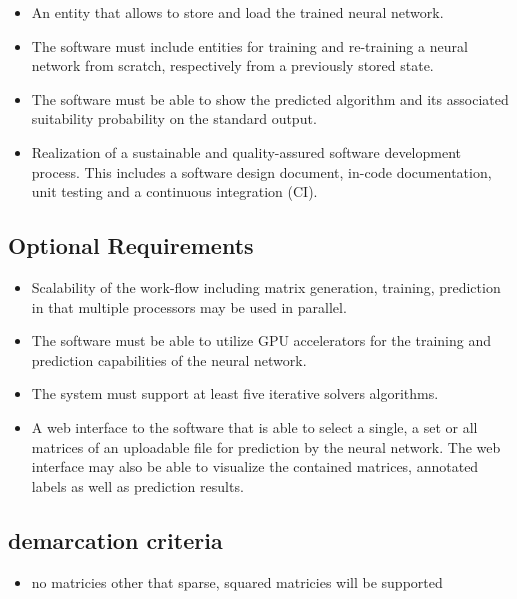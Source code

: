 \documentclass[parskip=full]{scrartcl}
\begin{document}
\begin{itemize}
\item An entity that allows to store and load the trained neural network.

\item The software must include entities for training and re-training a neural network from scratch, respectively from a previously stored state.

\item The software must be able to show the predicted algorithm and its associated suitability probability on the standard output.

\item Realization of a sustainable and quality-assured software development process. This includes a software design document, in-code documentation, unit testing and a continuous integration (CI).

\end{itemize}

\subsection{Optional Requirements}

\begin{itemize}
    
\item Scalability of the work-flow including matrix generation, training, prediction in that multiple processors may be used in parallel.

\item The software must be able to utilize GPU accelerators for the training and prediction capabilities of the neural network.

\item The system must support at least five \glspl{iterative solver} algorithms.

\item A web interface to the software that is able to select a single, a set or all matrices of an uploadable file for prediction by the neural network. The web interface may also be able to visualize the contained matrices, annotated labels as well as prediction results.

\end{itemize}

\subsection{demarcation criteria}
\begin{itemize}
\item no matricies other that sparse, squared matricies will be supported
\end{itemize}
\end{document}
